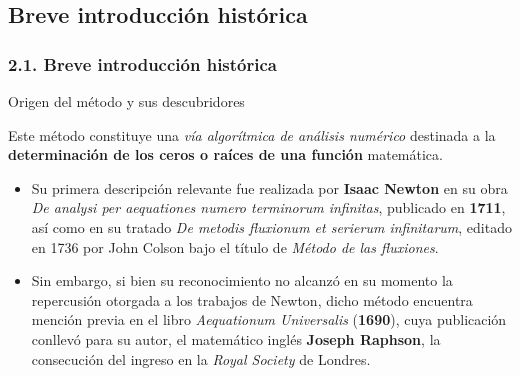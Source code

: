 \documentclass{beamer}
\begin{document}
\subsection{Breve introducción histórica}
\begin{frame}
\frametitle{2.1. Breve introducción histórica}
\begin{block}{Origen del método y sus descubridores}

Este método constituye una \emph{vía algorítmica de análisis numérico} destinada a la 
\textbf{determinación de los ceros o raíces de una función} matemática.

    \begin{itemize} \pause
      \item
        Su primera descripción relevante fue realizada por \textbf{Isaac Newton} en su obra 
        \emph{De analysi per aequationes numero terminorum infinitas}, publicado en \textbf{1711}, 
        así como en su tratado \emph{De metodis fluxionum et serierum infinitarum}, editado en 
        1736 por John Colson bajo el título de \emph{Método de las fluxiones}.
        \pause
      \item 
        Sin embargo, si bien su reconocimiento no alcanzó en su momento la repercusión 
        otorgada a los trabajos de Newton, dicho método encuentra mención previa en el libro 
        \emph {Aequationum Universalis} (\textbf{1690}), cuya publicación conllevó para su autor, 
        el matemático inglés \textbf{Joseph Raphson}, la consecución del ingreso en la \emph{Royal 
        Society} de Londres.  
    \end{itemize}

\end{block}
\end{frame} 

\end{document}
